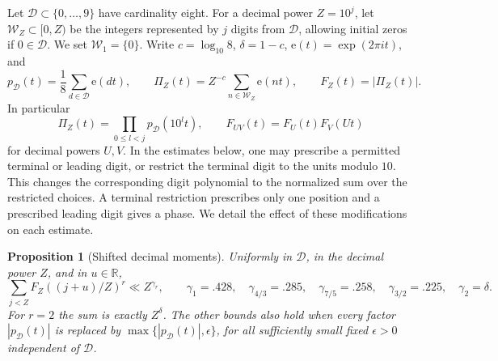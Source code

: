 \documentclass[11pt,a4paper]{article}
\theoremstyle{paperplain}
\newtheorem{proposition}[theorem]{Proposition}
\numberwithin{equation}{section}
\newcommand{\e}{\mathrm e}
\begin{document}
Let \(\mathcal D\subset\{0,\ldots,9\}\) have cardinality eight. For a decimal
power \(Z=10^j\), let \(\mathcal W_Z\subset[0,Z)\) be the integers
represented by \(j\) digits from \(\mathcal D\), allowing initial zeros if
\(0\in\mathcal D\). We set \(\mathcal W_1=\{0\}\). Write \(c=\log_{10}8\),
\(\delta=1-c\), \(\e(t)=\exp(2\pi i t)\), and
\[
 p_{\mathcal D}(t)=\frac18\sum_{d\in\mathcal D}\e(dt),\qquad
 \Pi_Z(t)=Z^{-c}\sum_{n\in\mathcal W_Z}\e(nt),\qquad F_Z(t)=|\Pi_Z(t)|.
\]
In particular
\begin{equation}\label{dt:digit-product}
 \Pi_Z(t)=\prod_{0\le l<j}p_{\mathcal D}(10^lt),\qquad
 F_{UV}(t)=F_U(t)F_V(Ut)
\end{equation}
for decimal powers \(U,V\). In the estimates below, one may
prescribe a permitted terminal or leading digit, or restrict the
terminal digit to the units modulo \(10\). This changes the
corresponding digit polynomial to the normalized sum over the
restricted choices. A terminal restriction prescribes only one
position and a prescribed leading digit gives a phase. We detail
the effect of these modifications on each estimate.

\begin{proposition}[Shifted decimal moments]\label{dt:digit-moments}
Uniformly in \(\mathcal D\), in the decimal power \(Z\), and in \(u\in\mathbb R\),
\begin{equation}\label{dt:digit-decimal-moment}
 \sum_{j<Z}F_Z((j+u)/Z)^r\ll Z^{\gamma_r},
 \qquad
 \gamma_1=.428,\quad
 \gamma_{4/3}=.285,\quad
 \gamma_{7/5}=.258,\quad
 \gamma_{3/2}=.225,\quad
 \gamma_2=\delta.
\end{equation}
For \(r=2\) the sum is exactly \(Z^\delta\). The other bounds
also hold when every factor \(|p_{\mathcal D}(t)|\) is replaced by
\(\max\{|p_{\mathcal D}(t)|,\epsilon\}\), for all sufficiently small fixed
\(\epsilon>0\) independent of \(\mathcal D\).
\end{proposition}
\end{document}
